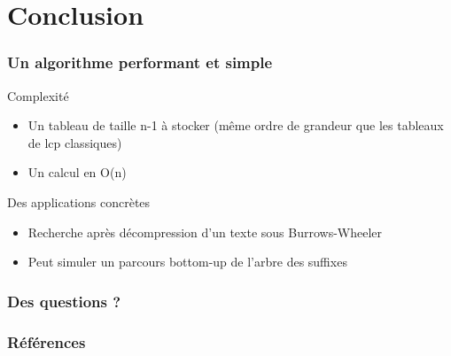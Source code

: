 \documentclass[10pt]{beamer}
\begin{document}




\section{Conclusion}
\label{sec:conclusion}

\begin{frame}
  \frametitle{Un algorithme performant et simple}

  \begin{block}{Complexité}
    \begin{itemize}
    \item Un tableau de taille n-1 à stocker (même ordre de grandeur que les
      tableaux de lcp classiques)
    \item Un calcul en O(n)
    \end{itemize}
  \end{block}

  \begin{block}{Des applications concrètes}
    \begin{itemize}
    \item Recherche après décompression d'un texte sous Burrows-Wheeler
    \item Peut simuler un parcours bottom-up de l'arbre des suffixes
    \end{itemize}
  \end{block}

\end{frame}

\begin{frame}
  \frametitle{Des questions ?}



\end{frame}

\begin{frame}
  \frametitle{Références}
  
  
\end{frame}
\end{document}
